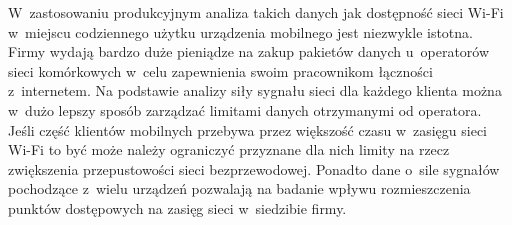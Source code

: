 W~zastosowaniu produkcyjnym analiza takich danych jak dostępność sieci
Wi-Fi w~miejscu codziennego użytku urządzenia mobilnego jest niezwykle
istotna. Firmy wydają bardzo duże pieniądze na zakup pakietów danych
u~operatorów sieci komórkowych w~celu zapewnienia swoim pracownikom
łączności z~internetem. Na podstawie analizy siły sygnału sieci dla
każdego klienta można w~dużo lepszy sposób zarządzać limitami danych
otrzymanymi od operatora. Jeśli część klientów mobilnych przebywa
przez większość czasu w~zasięgu sieci Wi-Fi to być może należy
ograniczyć przyznane dla nich limity na rzecz zwiększenia
przepustowości sieci bezprzewodowej. Ponadto dane o~sile sygnałów
pochodzące z~wielu urządzeń pozwalają na badanie wpływu rozmieszczenia
punktów dostępowych na zasięg sieci w~siedzibie firmy.
